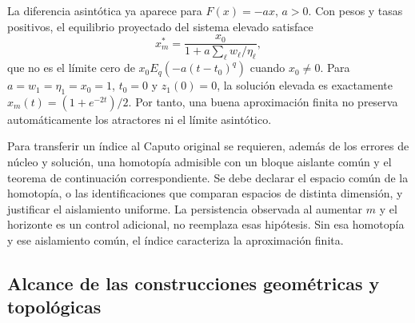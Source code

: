 La diferencia asintótica ya aparece para $F(x)=-ax$, $a>0$. Con pesos y tasas
positivos, el equilibrio proyectado del sistema elevado satisface
\[
 x_m^*=\frac{x_0}{1+a\sum_\ell w_\ell/\eta_\ell},
\]
que no es el límite cero de $x_0E_q(-a(t-t_0)^q)$ cuando $x_0\ne0$.
Para $a=w_1=\eta_1=x_0=1$, $t_0=0$ y $z_1(0)=0$, la solución elevada es
exactamente $x_m(t)=(1+e^{-2t})/2$. Por tanto, una buena aproximación finita
no preserva automáticamente los atractores ni el límite asintótico.

Para transferir un índice al Caputo original se requieren, además de los
errores de núcleo y solución, una homotopía admisible con un bloque aislante
común y el teorema de continuación correspondiente. Se debe declarar el
espacio común de la homotopía, o las identificaciones que comparan espacios
de distinta dimensión, y justificar el aislamiento uniforme. La persistencia
observada al aumentar $m$ y el horizonte es un control adicional, no reemplaza
esas hipótesis. Sin esa homotopía y ese aislamiento común, el índice caracteriza
la aproximación finita.

\subsection{Alcance de las construcciones geométricas y topológicas}
\label{subsec:gt-novelty-map}

